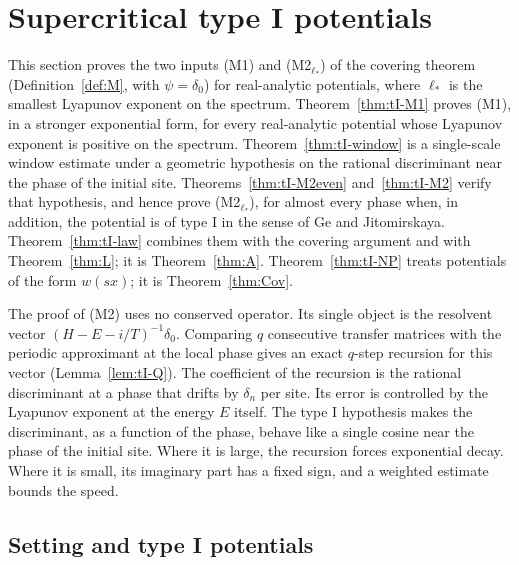 \section{Supercritical type I potentials}\label{sec:typeI}

This section proves the two inputs (M1) and (M2$_{\ell_*}$) of the covering theorem (Definition~\ref{def:M}, with $\psi=\delta_0$) for real-analytic potentials, where $\ell_*$ is the smallest Lyapunov exponent on the spectrum. Theorem~\ref{thm:tI-M1} proves (M1), in a stronger exponential form, for every real-analytic potential whose Lyapunov exponent is positive on the spectrum. Theorem~\ref{thm:tI-window} is a single-scale window estimate under a geometric hypothesis on the rational discriminant near the phase of the initial site. Theorems~\ref{thm:tI-M2even} and~\ref{thm:tI-M2} verify that hypothesis, and hence prove (M2$_{\ell_*}$), for almost every phase when, in addition, the potential is of type I in the sense of Ge and Jitomirskaya. Theorem~\ref{thm:tI-law} combines them with the covering argument and with Theorem~\ref{thm:L}; it is Theorem~\ref{thm:A}. Theorem~\ref{thm:tI-NP} treats potentials of the form $w(sx)$; it is Theorem~\ref{thm:Cov}.

The proof of (M2) uses no conserved operator. Its single object is the resolvent vector $(H-E-i/T)^{-1}\delta_0$. Comparing $q$ consecutive transfer matrices with the periodic approximant at the local phase gives an exact $q$-step recursion for this vector (Lemma~\ref{lem:tI-Q}). The coefficient of the recursion is the rational discriminant at a phase that drifts by $\delta_n$ per site. Its error is controlled by the Lyapunov exponent at the energy $E$ itself. The type I hypothesis makes the discriminant, as a function of the phase, behave like a single cosine near the phase of the initial site. Where it is large, the recursion forces exponential decay. Where it is small, its imaginary part has a fixed sign, and a weighted estimate bounds the speed.

\subsection{Setting and type I potentials}\label{sec:tI-setting}


